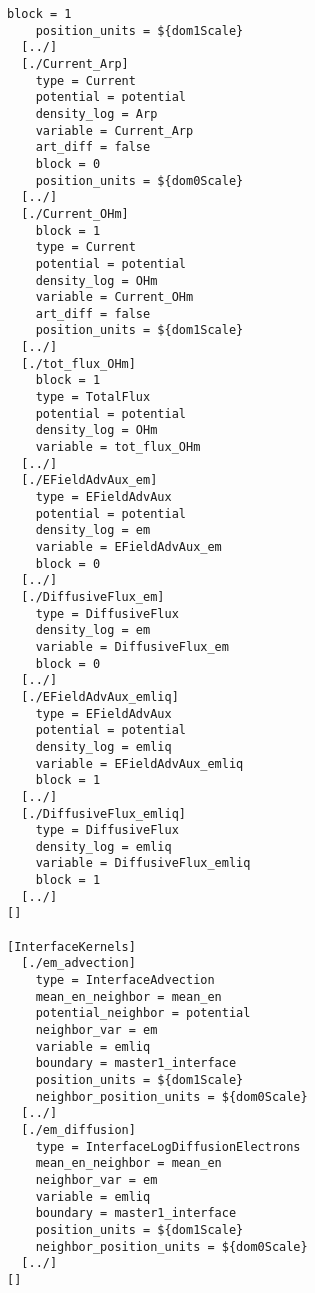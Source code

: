 \begin{lstlisting}[caption = Exemplary Zapdos input file, label = code:input_file]
    block = 1
    position_units = ${dom1Scale}
  [../]
  [./Current_Arp]
    type = Current
    potential = potential
    density_log = Arp
    variable = Current_Arp
    art_diff = false
    block = 0
    position_units = ${dom0Scale}
  [../]
  [./Current_OHm]
    block = 1
    type = Current
    potential = potential
    density_log = OHm
    variable = Current_OHm
    art_diff = false
    position_units = ${dom1Scale}
  [../]
  [./tot_flux_OHm]
    block = 1
    type = TotalFlux
    potential = potential
    density_log = OHm
    variable = tot_flux_OHm
  [../]
  [./EFieldAdvAux_em]
    type = EFieldAdvAux
    potential = potential
    density_log = em
    variable = EFieldAdvAux_em
    block = 0
  [../]
  [./DiffusiveFlux_em]
    type = DiffusiveFlux
    density_log = em
    variable = DiffusiveFlux_em
    block = 0
  [../]
  [./EFieldAdvAux_emliq]
    type = EFieldAdvAux
    potential = potential
    density_log = emliq
    variable = EFieldAdvAux_emliq
    block = 1
  [../]
  [./DiffusiveFlux_emliq]
    type = DiffusiveFlux
    density_log = emliq
    variable = DiffusiveFlux_emliq
    block = 1
  [../]
[]

[InterfaceKernels]
  [./em_advection]
    type = InterfaceAdvection
    mean_en_neighbor = mean_en
    potential_neighbor = potential
    neighbor_var = em
    variable = emliq
    boundary = master1_interface
    position_units = ${dom1Scale}
    neighbor_position_units = ${dom0Scale}
  [../]
  [./em_diffusion]
    type = InterfaceLogDiffusionElectrons
    mean_en_neighbor = mean_en
    neighbor_var = em
    variable = emliq
    boundary = master1_interface
    position_units = ${dom1Scale}
    neighbor_position_units = ${dom0Scale}
  [../]
[]


\end{lstlisting}
